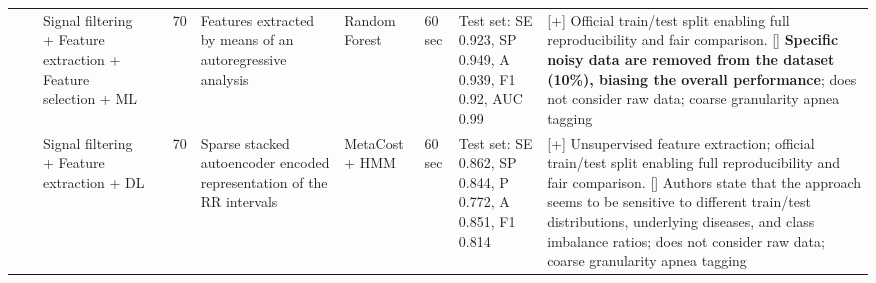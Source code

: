 \documentclass[5p,twocolumn,lefttitle]{elsarticle}
\begin{document}
\begin{table*}[!ht]
{\begin{tabularx}{2\textwidth}{@{}m{2.5em}p{7em}p{10em}lp{2em}p{12em}p{7em}p{3em}p{17em}X@{}}
                            &                                                         & Signal filtering + Feature extraction + Feature selection + ML & \cite{zarei2020performance}              & 70            & Features extracted by means of an autoregressive analysis                                                         & Random Forest                       & 60 sec                                     & Test set: SE 0.923, SP 0.949, A 0.939, F1 0.92, AUC 0.99                                                                                                                             & [+]  Official train/test split enabling full reproducibility and fair comparison. [] \textbf{Specific noisy data are removed from the dataset (10\%), biasing the overall performance}; does not consider raw data; coarse granularity apnea tagging                                                                                                                                                                                                          \\
                            \cmidrule(l){3-10} 
                            &                                                         & Signal filtering + Feature extraction + DL                     & \cite{feng2020sleep}                     & 70            & Sparse stacked autoencoder encoded representation of the RR intervals                                             & MetaCost + HMM                      & 60 sec                                     & Test set: SE 0.862, SP 0.844, P 0.772, A 0.851, F1 0.814                                                                                                                                  & [+] Unsupervised feature extraction; official train/test split enabling full reproducibility and fair comparison. [] Authors state that the approach seems to be sensitive to different train/test distributions, underlying diseases, and class imbalance ratios; does not consider raw data; coarse granularity apnea tagging                                                                                                                      \\
                            \cmidrule(l){3-10} 

\end{tabularx}}
\end{table*}
\end{document}
